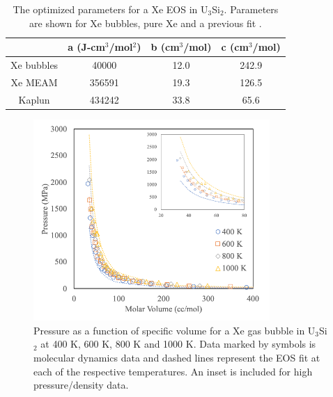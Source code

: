 \documentclass[review]{elsarticle}
\begin{document}
\begin{table}[h]
\caption{The optimized parameters for a Xe EOS in U$_3$Si$_2$. Parameters are shown for Xe bubbles, pure Xe and a previous fit \cite{kaplun2003}.}\label{tab:eos}
\begin{center}
\begin{tabular}{|c|c|c|c|}
 \hline
  & a (J-cm$^3$/mol$^2$) & b (cm$^3$/mol) & c (cm$^3$/mol) \\ 
 \hline
 Xe bubbles & 40000 & 12.0 & 242.9 \\ 
 Xe MEAM & 356591 & 19.3 & 126.5 \\ 
 Kaplun \cite{kaplun2003} & 434242 & 33.8 & 65.6 \\ 
 \hline
\end{tabular}
\end{center}
\label{default}
\end{table}%


\begin{figure}[hbt]
	\centering
	\includegraphics[width=0.8\textwidth]{bubble_eosa.png}
 \caption{Pressure as a function of specific volume for a Xe gas bubble in U$_3$Si$_2$ at 400 K, 600 K, 800 K and 1000 K. Data marked by symbols is molecular dynamics data and dashed lines represent the EOS fit at each of the respective temperatures. An inset is included for high pressure/density data. }\label{fig:eos_sum}
\end{figure}

\FloatBarrier
\end{document}
